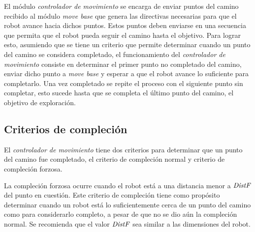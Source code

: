 

El módulo \emph{controlador de movimiento} se encarga de enviar puntos del
camino recibido al módulo \emph{move base} que genera las directivas necesarias
para que el robot avance hacia dichos puntos. Estos puntos deben enviarse en
una secuencia que permita que el robot pueda seguir el camino hasta el
objetivo. Para lograr esto, asumiendo que se tiene un criterio que permite
determinar cuando un punto del camino se considera completado, el
funcionamiento del \emph{controlador de movimiento} consiste en determinar el
primer punto no completado del camino, enviar dicho punto a \emph{move base} y
esperar a que el robot avance lo suficiente para completarlo. Una vez
completado se repite el proceso con el siguiente punto sin completar, esto
sucede hasta que se completa el último punto del camino, el objetivo de
exploración.


\subsection{Criterios de compleción}

El \emph{controlador de movimiento} tiene dos criterios para determinar que un
punto del camino fue completado, el criterio de compleción normal y criterio de
compleción forzosa.

La compleción forzosa ocurre cuando el robot está a una distancia menor a
$\mathit{DistF}$ del punto en cuestión. Este criterio de compleción tiene como
propósito determinar cuando un robot está lo suficientemente cerca de un punto
del camino como para considerarlo completo, a pesar de que no se dio aún la
compleción normal. Se recomienda que el valor $\mathit{DistF}$ sea similar a las
dimensiones del robot.

